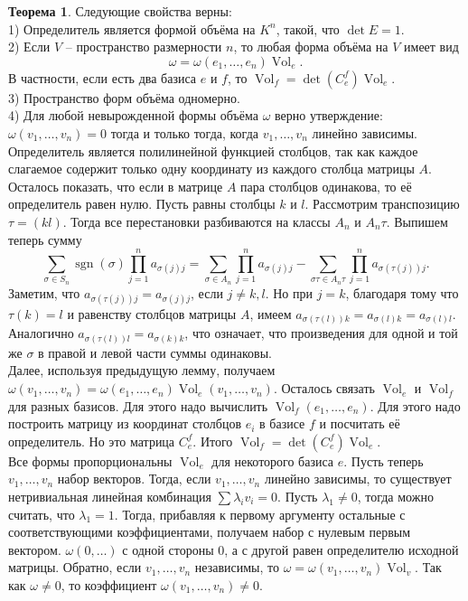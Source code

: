 \documentclass[10pt,a4paper,oneside]{book}
\theoremstyle{definition}
\newtheorem{thm}{Теорема}
\newcommand{\Vol}{\operatorname{Vol}}
\newcommand{\sgn}{\operatorname{sgn}}
\begin{document}
\begin{thm} Следующие свойства верны:\\
1) Определитель является формой объёма на $K^n$, такой, что $\det E=1$.\\
2) Если $V$ -- пространство размерности $n$, то любая форма объёма на $V$ имеет вид $$\omega=\omega(e_1,\dots,e_n)\Vol_e.$$
В частности, если есть два базиса $e$ и $f$, то $\Vol_{f}=\det(C^f_{e}) \Vol_{e}$.\\
3) Пространство форм объёма одномерно.\\
4) Для любой невырожденной формы объёма $\omega$ верно утверждение: $\omega(v_1,\dots,v_n)=0$ тогда и только тогда, когда $v_1,\dots,v_n$ линейно зависимы.
\proof Определитель является полилинейной функцией столбцов, так как  каждое слагаемое содержит только одну координату из каждого столбца матрицы $A$. Осталось показать, что если в матрице $A$ пара столбцов одинакова, то её определитель равен нулю.
Пусть равны столбцы $k$ и $l$. Рассмотрим транспозицию $\tau=(kl)$. Тогда все перестановки разбиваются на классы $A_n$ и $A_n\tau$. Выпишем теперь сумму
$$\sum_{\sigma \in S_n} \sgn(\sigma)\prod_{j=1}^n a_{\sigma(j)j} = \sum_{\sigma \in A_n} \prod_{j=1}^n a_{\sigma(j)j}- \sum_{\sigma\tau \in A_n\tau} \prod_{j=1}^n a_{\sigma(\tau(j))j}.$$
Заметим, что $a_{\sigma(\tau(j))j}=a_{\sigma(j)j}$, если $j\neq k,l$. Но при  $j=k$, благодаря тому что $\tau(k)=l$  и равенству столбцов матрицы $A$, имеем $a_{\sigma(\tau(l))k}=a_{\sigma(l)k}=a_{\sigma(l)l}$. Аналогично $a_{\sigma(\tau(l))l}=a_{\sigma(k)k}$, что означает, что произведения для одной и той же $\sigma$ в правой и левой части суммы одинаковы.\\

Далее, используя предыдущую лемму, получаем $\omega(v_1,\dots,v_n)=\omega(e_1,\dots,e_n)\Vol_e(v_1,\dots,v_n)$. Осталось связать $\Vol_e$ и $\Vol_f$ для разных базисов. Для этого надо вычислить $\Vol_f(e_1,\dots,e_n)$. Для этого надо построить матрицу из координат столбцов $e_i$ в базисе $f$ и посчитать её определитель. Но это матрица $C_{e}^f$. Итого $\Vol_{f}=\det(C^f_{e}) \Vol_{e}$. \\
Все формы пропорциональны $\Vol_e$ для некоторого базиса $e$.
Пусть теперь $v_1,\dots,v_n$ набор векторов. Тогда, если $v_1,\dots,v_n$ линейно зависимы, то существует нетривиальная линейная комбинация $\sum \lambda_i v_i=0$. Пусть $\lambda_1\neq 0$, тогда можно считать, что $\lambda_1=1$. Тогда, прибавляя к первому аргументу остальные с соответствующими коэффициентами, получаем набор с нулевым первым вектором. $\omega(0,\dots)$ с одной стороны 0, а с другой равен определителю исходной матрицы.
Обратно, если $v_1,\dots,v_n$ независимы, то $\omega=\omega(v_1,\dots,v_n)\Vol_v$. Так как $\omega \neq 0$, то коэффициент $\omega(v_1, \dots,v_n)\neq 0$.
\endproof
\end{thm}
\end{document}
